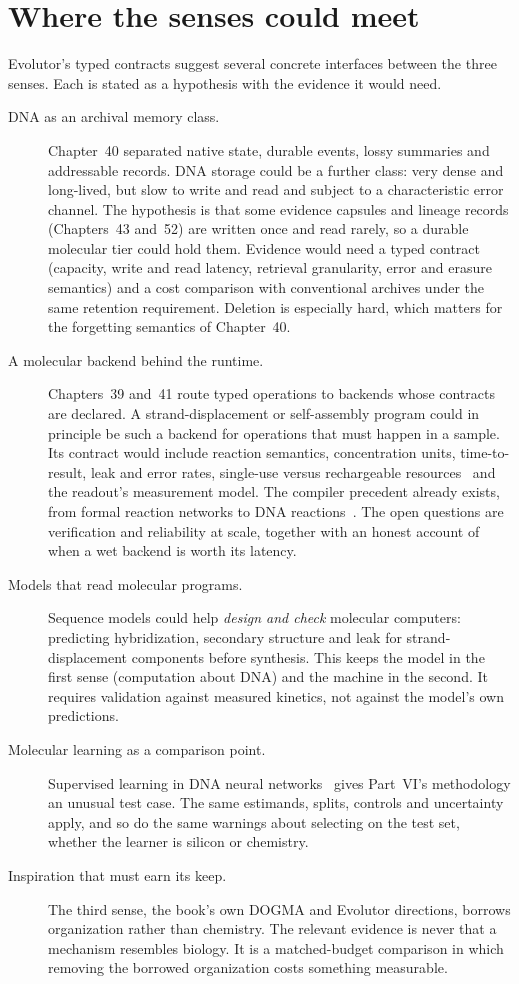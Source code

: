 \section*{Where the senses could meet}
Evolutor's typed contracts suggest several concrete interfaces between the three
senses. Each is stated as a hypothesis with the evidence it would need.

\begin{description}
\item[DNA as an archival memory class.] Chapter~40 separated native state, durable
events, lossy summaries and addressable records. DNA storage could be a further class:
very dense and long-lived, but slow to write and read and subject to a characteristic
error channel. The hypothesis is that some evidence capsules and lineage records
(Chapters~43 and~52) are written once and read rarely, so a durable molecular tier
could hold them. Evidence would need a typed contract (capacity, write and read latency,
retrieval granularity, error and erasure semantics) and a cost comparison with
conventional archives under the same retention requirement. Deletion is especially
hard, which matters for the forgetting semantics of Chapter~40.
\item[A molecular backend behind the runtime.] Chapters~39 and~41 route typed operations
to backends whose contracts are declared. A strand-displacement or self-assembly
program could in principle be such a backend for operations that must happen in a
sample. Its contract would include reaction semantics, concentration units,
time-to-result, leak and error rates, single-use versus rechargeable
resources~\cite{songqian2025} and the readout's measurement model. The compiler
precedent already exists, from formal reaction networks to DNA
reactions~\cite{soloveichik2010}. The open questions are verification and reliability
at scale, together with an honest account of when a wet backend is worth its latency.
\item[Models that read molecular programs.] Sequence models could help \emph{design and
check} molecular computers: predicting hybridization, secondary structure and leak
for strand-displacement components before synthesis. This keeps the model in the
first sense (computation about DNA) and the machine in the second. It requires
validation against measured kinetics, not against the model's own predictions.
\item[Molecular learning as a comparison point.] Supervised learning in DNA neural
networks~\cite{cherryqian2025} gives Part~VI's methodology an unusual test case. The
same estimands, splits, controls and uncertainty apply, and so do the same warnings
about selecting on the test set, whether the learner is silicon or chemistry.
\item[Inspiration that must earn its keep.] The third sense, the book's own DOGMA and
Evolutor directions, borrows organization rather than chemistry. The relevant evidence
is never that a mechanism resembles biology. It is a matched-budget comparison in which
removing the borrowed organization costs something measurable.
\end{description}

